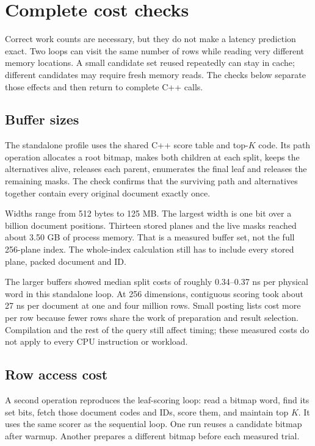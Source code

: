 \section{Complete cost checks}
\label{sec:cost-validation}
Correct work counts are necessary, but they do not make a latency prediction exact. Two loops
can visit the same number of rows while reading very different memory locations. A small
candidate set reused repeatedly can stay in cache; different candidates may require fresh
memory reads. The checks below separate those effects and then return to complete C++ calls.

\subsection{Buffer sizes}
The standalone profile uses the shared C++ score table and top-$K$ code. Its path operation
allocates a root bitmap, makes both children at each split, keeps the alternatives alive,
releases each parent, enumerates the final leaf and releases the remaining masks. The check confirms that the surviving path and alternatives together contain every original
document exactly once.

Widths range from 512 bytes to 125 MB. The largest width is one bit over a billion document
positions. Thirteen stored planes and the live masks reached about 3.50 GB of process memory.
That is a measured buffer set, not the full 256-plane index. The whole-index calculation still
has to include every stored plane, packed document and ID.

The larger buffers showed median split costs of roughly 0.34--0.37 ns per physical word in this
standalone loop. At 256 dimensions, contiguous scoring took about 27 ns per document at one
and four million rows. Small posting lists cost more per row because fewer rows share the work of preparation and
result selection. Compilation and the rest of the query still affect timing; these measured
costs do not apply to every CPU instruction or workload.

\subsection{Row access cost}
A second operation reproduces the leaf-scoring loop: read a bitmap word, find its set bits,
fetch those document codes and IDs, score them, and maintain top $K$. It uses the same scorer
as the sequential loop. One run reuses a candidate bitmap after warmup. Another prepares a
different bitmap before each measured trial.

